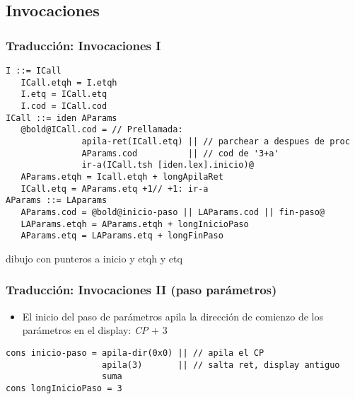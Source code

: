 \documentclass[hyperref={pdfpagelabels=false},tree-dvips,compress]{beamer}
\begin{document}
\subsection{Invocaciones}
\begin{frame}[fragile]
\frametitle{Traducción: Invocaciones I}

\begin{lstlisting}[style=gramaticas,basicstyle=\scriptsize\ttfamily,mathescape]
I ::= ICall
   ICall.etqh = I.etqh
   I.etq = ICall.etq
   I.cod = ICall.cod
ICall ::= iden AParams
   @bold@ICall.cod = // Prellamada:
               apila-ret(ICall.etq) || // parchear a despues de proc
               AParams.cod          || // cod de '3+a'
               ir-a(ICall.tsh [iden.lex].inicio)@
   AParams.etqh = Icall.etqh + longApilaRet
   ICall.etq = AParams.etq +1// +1: ir-a
AParams ::= LAparams
   AParams.cod = @bold@inicio-paso || LAParams.cod || fin-paso@
   LAParams.etqh = AParams.etqh + longInicioPaso
   AParams.etq = LAParams.etq + longFinPaso
\end{lstlisting}

	dibujo con punteros a inicio y etqh y etq

\end{frame}
\begin{frame}[fragile]
\frametitle{Traducción: Invocaciones II (paso parámetros)}

\begin{itemize}
	\item El inicio del paso de parámetros apila la dirección de comienzo de los parámetros en el display: \emph{CP} + 3
\end{itemize}

\begin{lstlisting}[style=codigoMP,basicstyle=\scriptsize\ttfamily,mathescape]
cons inicio-paso = apila-dir(0x0) || // apila el CP
                   apila(3)       || // salta ret, display antiguo
                   suma
cons longInicioPaso = 3
\end{lstlisting}

\end{frame}
\end{document}
